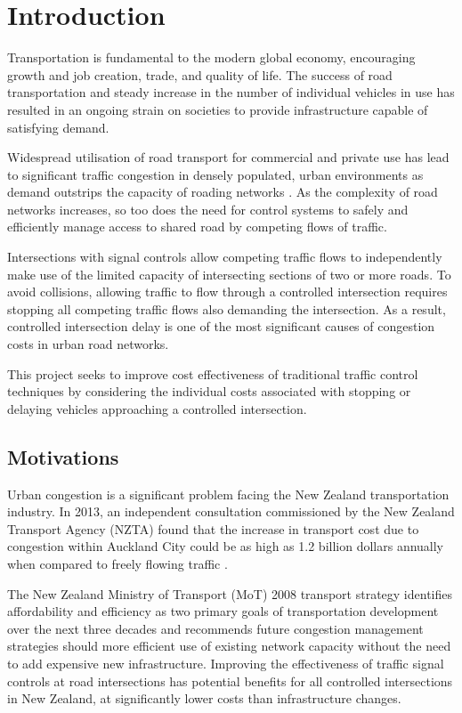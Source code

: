 \chapter{Introduction}

Transportation is fundamental to the modern global economy, encouraging growth and job creation, trade, and quality of life. The success of road transportation and steady increase in the number of individual vehicles in use has resulted in an ongoing strain on societies to provide infrastructure capable of satisfying demand. 

Widespread utilisation of road transport for commercial and private use has lead to significant traffic congestion in densely populated, urban environments as demand outstrips the capacity of roading networks \cite{euro2011whitepaper}. As the complexity of road networks increases, so too does the need for control systems to safely and efficiently manage access to shared road by competing flows of traffic. 

Intersections with signal controls allow competing traffic flows to independently make use of the limited capacity of intersecting sections of  two or more roads. To avoid collisions, allowing traffic to flow through a controlled intersection requires stopping all competing traffic flows also demanding the intersection. As a result, controlled intersection delay is one of the most significant causes of congestion costs in urban road networks.

This project seeks to improve cost effectiveness of traditional traffic control techniques by considering the individual costs associated with stopping or delaying vehicles approaching a controlled intersection.

\section {Motivations}

Urban congestion is a significant problem facing the New Zealand transportation industry. In 2013, an independent consultation commissioned by the New Zealand Transport Agency (NZTA) found that the increase in transport cost due to congestion within Auckland City could be as high as 1.2 billion dollars annually when compared to freely flowing traffic \cite{wallis2013costs}. 

The New Zealand Ministry of Transport (MoT) 2008 transport strategy identifies affordability and efficiency as two primary goals of transportation development over the next three decades and recommends future congestion management strategies should more efficient use of existing network capacity without the need to add expensive new infrastructure. Improving the effectiveness of traffic signal controls at road intersections has potential benefits for all controlled intersections in New Zealand, at significantly lower costs than infrastructure changes.

